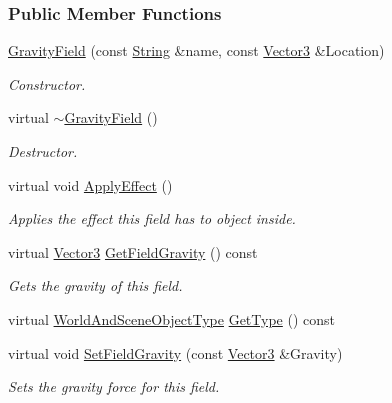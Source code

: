 \subsubsection*{Public Member Functions}
\begin{DoxyCompactItemize}
\item 
\hyperlink{classMezzanine_1_1GravityField_aff8a73a59ad999b49f39c4bfb564fed3}{GravityField} (const \hyperlink{namespaceMezzanine_acf9fcc130e6ebf08e3d8491aebcf1c86}{String} \&name, const \hyperlink{classMezzanine_1_1Vector3}{Vector3} \&Location)
\begin{DoxyCompactList}\small\item\em Constructor. \item\end{DoxyCompactList}\item 
virtual \hyperlink{classMezzanine_1_1GravityField_a53fe69bb37458dce9fca8df1215d739e}{$\sim$GravityField} ()
\begin{DoxyCompactList}\small\item\em Destructor. \item\end{DoxyCompactList}\item 
virtual void \hyperlink{classMezzanine_1_1GravityField_a53aee6679088fb6151e5cb6e82a09fb7}{ApplyEffect} ()
\begin{DoxyCompactList}\small\item\em Applies the effect this field has to object inside. \item\end{DoxyCompactList}\item 
virtual \hyperlink{classMezzanine_1_1Vector3}{Vector3} \hyperlink{classMezzanine_1_1GravityField_ad37d2c94bdabf0412e35ed59ad74e8c9}{GetFieldGravity} () const 
\begin{DoxyCompactList}\small\item\em Gets the gravity of this field. \item\end{DoxyCompactList}\item 
virtual \hyperlink{namespaceMezzanine_ae8cd04f706f4998be62f454b7119c718}{WorldAndSceneObjectType} \hyperlink{classMezzanine_1_1GravityField_a9b48f173312a02cd98ac19a8c444c10e}{GetType} () const 
\item 
virtual void \hyperlink{classMezzanine_1_1GravityField_a426b69dcfd3476029ebadea1ee4e0ea3}{SetFieldGravity} (const \hyperlink{classMezzanine_1_1Vector3}{Vector3} \&Gravity)
\begin{DoxyCompactList}\small\item\em Sets the gravity force for this field. \item\end{DoxyCompactList}\end{DoxyCompactItemize}
